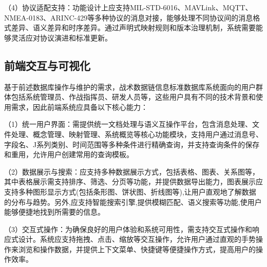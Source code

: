 \begin{table}[!htb]
    \caption{系统API接口功能表}
    \label{table_api_interfaces}
    \centering
\end{table}

（4）协议适配支持：功能设计上应支持MIL-STD-6016、MAVLink、MQTT、NMEA-0183、ARINC-429等多种协议的消息对接，能够处理不同协议间的消息格式差异、语义差异和时序差异。通过声明式映射规则和版本治理机制，系统需要能够灵活应对协议演进和标准更新。


\subsection{前端交互与可视化}
基于前述数据库操作与维护的需求，战术数据链信息标准数据库系统面向的用户群体包括系统管理员、作战指挥员、研发人员等，这些用户具有不同的技术背景和使用需求，因此前端系统应具备以下核心能力：

（1）统一用户界面：需提供统一文档处理与语义互操作平台，包含消息处理、文件处理、概念管理、映射管理、系统概览等核心功能模块，支持用户通过消息号、字段名、J系列类别、时间范围等多种条件进行精确查询，并支持查询条件的保存和重用，允许用户创建常用的查询模板。

（2）数据展示与搜索：应支持多种数据展示方式，包括表格、图表、关系图等，其中表格展示需支持排序、筛选、分页等功能，并提供数据导出能力，图表展示应支持多种图形显示方式(包括条形图、饼状图、折线图等),让用户直观地了解数据的分布与趋势。另外,应支持智能搜索引擎,提供模糊匹配、语义搜索等功能,使用户能够便捷地找到所需要的信息。

（3）交互式操作：为确保良好的用户体验和系统可用性，需支持交互式操作和响应式设计。系统应支持拖拽、点击、缩放等交互操作，允许用户通过直观的手势操作来浏览和操作数据，并提供上下文菜单、快捷键等便捷操作方式，提高用户的操作效率。

